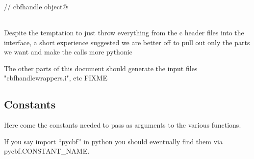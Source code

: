 \documentclass[10pt,a4paper,twoside,notitlepage]{article}
\begin{document}
\begin{flushleft}
\begin{list}{}{}
\mbox{}\verb@@\\
\mbox{}\verb@%include "cbfgoniometerwrappers.i"@\\
\mbox{}\verb@@\\
\mbox{}\verb@%include "cbfdetectorwrappers.i"@\\
\mbox{}\verb@@\\
\mbox{}\verb@// cbfhandle object@\\
\mbox{}\verb@%include "cbfhandlewrappers.i"@\\
\mbox{}\verb@@\\
\mbox{}\verb@@{\NWsep}
\end{list}
\vspace{-2ex}
\end{flushleft}
Despite the temptation to just throw everything from the c header files
into the interface, a short experience suggested we are better off to pull 
out only the parts we want and make the calls more pythonic

The other parts of this document should generate the input files 
"cbfhandlewrappers.i", etc FIXME


\subsection{Constants}

Here come the constants needed to pass as arguments to the various functions.

If you say import ``pycbf'' in python you should eventually find them via
pycbf.CONSTANT\_NAME.
\end{document}
